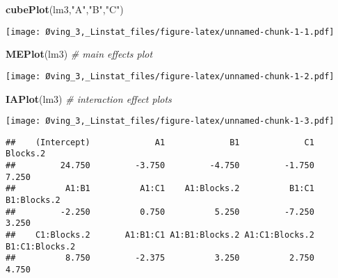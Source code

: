 \documentclass[]{article}
\newenvironment{Shaded}{\begin{snugshade}}{\end{snugshade}}
\newcommand{\KeywordTok}[1]{\textcolor[rgb]{0.13,0.29,0.53}{\textbf{#1}}}
\newcommand{\DecValTok}[1]{\textcolor[rgb]{0.00,0.00,0.81}{#1}}
\newcommand{\StringTok}[1]{\textcolor[rgb]{0.31,0.60,0.02}{#1}}
\newcommand{\CommentTok}[1]{\textcolor[rgb]{0.56,0.35,0.01}{\textit{#1}}}
\newcommand{\OperatorTok}[1]{\textcolor[rgb]{0.81,0.36,0.00}{\textbf{#1}}}
\newcommand{\NormalTok}[1]{#1}
\begin{document}
\begin{Shaded}
\begin{Highlighting}[]
\KeywordTok{cubePlot}\NormalTok{(lm3,}\StringTok{"A"}\NormalTok{,}\StringTok{"B"}\NormalTok{,}\StringTok{"C"}\NormalTok{)}
\end{Highlighting}
\end{Shaded}

\texttt{[image: Øving\_3,\_Linstat\_files/figure-latex/unnamed-chunk-1-1.pdf]}

\begin{Shaded}
\begin{Highlighting}[]
\KeywordTok{MEPlot}\NormalTok{(lm3) }\CommentTok{# main effects plot}
\end{Highlighting}
\end{Shaded}

\texttt{[image: Øving\_3,\_Linstat\_files/figure-latex/unnamed-chunk-1-2.pdf]}

\begin{Shaded}
\begin{Highlighting}[]
\KeywordTok{IAPlot}\NormalTok{(lm3) }\CommentTok{# interaction effect plots}
\end{Highlighting}
\end{Shaded}

\texttt{[image: Øving\_3,\_Linstat\_files/figure-latex/unnamed-chunk-1-3.pdf]}

\begin{Shaded}
\end{Shaded}

\begin{verbatim}
##    (Intercept)             A1             B1             C1       Blocks.2 
##         24.750         -3.750         -4.750         -1.750          7.250 
##          A1:B1          A1:C1    A1:Blocks.2          B1:C1    B1:Blocks.2 
##         -2.250          0.750          5.250         -7.250          3.250 
##    C1:Blocks.2       A1:B1:C1 A1:B1:Blocks.2 A1:C1:Blocks.2 B1:C1:Blocks.2 
##          8.750         -2.375          3.250          2.750          4.750
\end{verbatim}

\begin{Shaded}
\end{Shaded}
\end{document}

